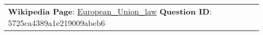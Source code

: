 \begin{figure*}[ht]
{\begin{tabular}{p{}}
            \textbf{Wikipedia Page}: \underline{European\_Union\_law} \textbf{Question ID}: 5725ca4389a1e219009abeb6                                                                                                                                                                                                                                                                                                                                                                                                                                                                                                                                                                                                                                                                                                                                                                                                                                                                                                                                                                                                                                                                                                                                                                                                                                                                                                                                                                                                                                                                                                                                                                                                                                                                                                                                                                                                                                                                                                \\

\end{tabular}}
\end{figure*}
